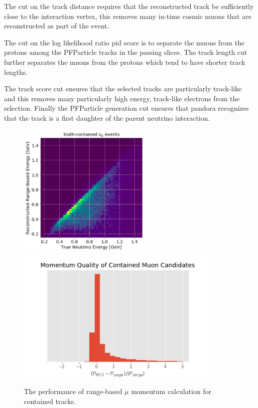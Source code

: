 \par The cut on the track distance requires that the reconstructed track be sufficiently close to the interaction vertex, this removes many in-time cosmic muons that are reconstructed as part of the event.

\par The cut on the log likelihood ratio pid score is to separate the muons from the protons among the PFParticle tracks in the passing slices. The track length cut further separates the muons from the protons which tend to have shorter track lengths. 

\par The track score cut ensures that the selected tracks are particularly track-like and this removes many particularly high energy, track-like electrons from the selection. Finally the PFParticle generation cut ensures that pandora recognizes that the track is a first daughter of the parent neutrino interaction. 

\begin{figure}
    \centering
    \includegraphics[height=6.5cm]{NuMuCCsel/Images/Ryan/containedMomentumRes.png} \hspace{2mm}
    \includegraphics[height=6.5cm]{NuMuCCsel/Images/Ryan/muoncandidate_pquality.jpg} \hspace{2mm}
    \caption{The performance of range-based $\mu$ momentum calculation for contained tracks.}
    \label{fig:numusel:momres}
\end{figure}

